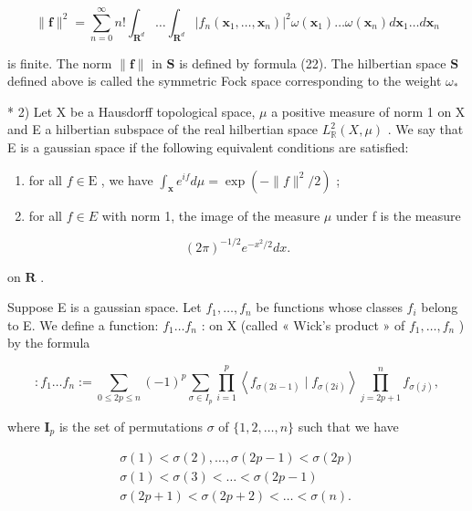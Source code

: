 \[
\| \mathbf {f} \| ^ {2} = \sum_ {n = 0} ^ {\infty} n! \int_ {\mathbf {R} ^ {d}} \dots \int_ {\mathbf {R} ^ {d}} \left| f _ {n} (\mathbf {x} _ {1}, \dots , \mathbf {x} _ {n}) \right| ^ {2} \omega (\mathbf {x} _ {1}) \dots \omega (\mathbf {x} _ {n}) d \mathbf {x} _ {1} \dots d \mathbf {x} _ {n}\tag{22}
\]

is finite. The norm \(\| \mathbf{f}\|\) in \(\mathbf{S}\) is defined by formula (22). The hilbertian space \(\mathbf{S}\) defined above is called the symmetric Fock space corresponding to the weight \(\omega_{*}\)

* 2) Let X be a Hausdorff topological space, \(\mu\) a positive measure of norm 1 on X and E a hilbertian subspace of the real hilbertian space \(L_{\mathbb{R}}^{2}(X,\mu)\) . We say that E is a gaussian space if the following equivalent conditions are satisfied:

\begin{enumerate}
\def\labelenumi{\alph{enumi})}
\item
  for all \(f \in \mathrm{E}\) , we have \(\int_{\mathbf{x}} e^{if} d\mu = \exp(-\|f\|^2/2)\) ;
\item
  for all \(f \in E\) with norm 1, the image of the measure \(\mu\) under f is the measure
\end{enumerate}

\[
(2 \pi) ^ {- 1 / 2} e ^ {- x ^ {2} / 2} d x.
\]

on \(\mathbf{R}\) .

Suppose E is a gaussian space. Let \(f_1, \ldots, f_n\) be functions whose classes \(f_i\) belong to E. We define a function: \(f_1 \ldots f_n\) : on X (called « Wick's product » of \(f_1, \ldots, f_n\) ) by the formula

\[
: f _ {1} \dots f _ {n} := \sum_ {0 \leqslant 2 p \leqslant n} (- 1) ^ {p} \sum_ {\sigma \in I _ {p}} \prod_ {i = 1} ^ {p} \left\langle f _ {\sigma (2 i - 1)} \mid f _ {\sigma (2 i)} \right\rangle \prod_ {j = 2 p + 1} ^ {n} f _ {\sigma (j)},\tag{23}
\]

where \(\mathbf{I}_p\) is the set of permutations \(\sigma\) of \(\{1,2,\dots,n\}\) such that we have

\[
\begin{array}{l} \sigma (1) <   \sigma (2), \dots , \sigma (2 p - 1) <   \sigma (2 p) \\ \sigma (1) <   \sigma (3) <   \dots <   \sigma (2 p - 1) \\ \sigma (2 p + 1) <   \sigma (2 p + 2) <   \dots <   \sigma (n). \end{array}
\]

